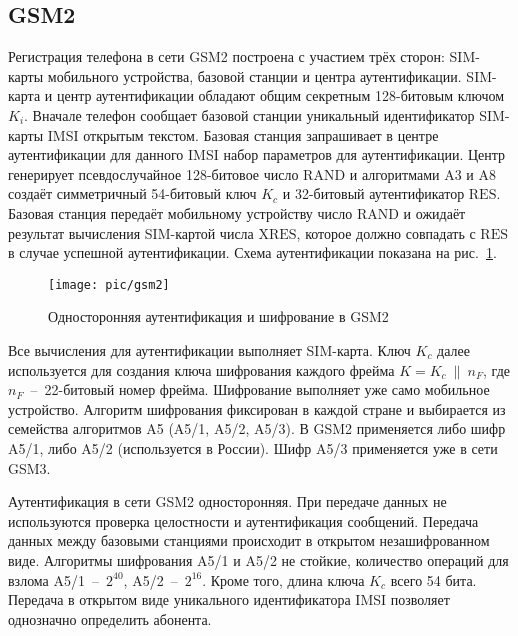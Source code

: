 \subsection{GSM2}

Регистрация телефона в сети GSM2 построена с участием трёх сторон: SIM-карты мобильного устройства, базовой станции и центра аутентификации. SIM-карта и центр аутентификации обладают общим секретным 128-битовым ключом $K_i$. Вначале телефон сообщает базовой станции уникальный идентификатор SIM-карты IMSI открытым текстом. Базовая станция запрашивает в центре аутентификации для данного IMSI набор параметров для аутентификации. Центр генерирует псевдослучайное 128-битовое число $\textrm{RAND}$ и алгоритмами A3 и A8 создаёт симметричный 54-битовый ключ $K_c$ и 32-битовый аутентификатор $\textrm{RES}$. Базовая станция передаёт мобильному устройству число $\textrm{RAND}$ и ожидаёт результат вычисления SIM-картой числа $\textrm{XRES}$, которое должно совпадать с $\textrm{RES}$ в случае успешной аутентификации. Схема аутентификации показана на рис.~\ref{fig:gsm2}.

\begin{figure}[!ht]
	\centering
	\texttt{[image: pic/gsm2]}
	\caption{Односторонняя аутентификация и шифрование в GSM2\label{fig:gsm2}}
\end{figure}

Все вычисления для аутентификации выполняет SIM-карта. Ключ $K_c$ далее используется для создания ключа шифрования каждого фрейма $K = K_c ~\|~ n_F$, где $n_F$~--~22-битовый номер фрейма. Шифрование выполняет уже само мобильное устройство. Алгоритм шифрования фиксирован в каждой стране и выбирается из семейства алгоритмов A5 (A5/1, A5/2, A5/3). В GSM2 применяется либо шифр A5/1, либо A5/2 (используется в России). Шифр A5/3 применяется уже в сети GSM3.

Аутентификация в сети GSM2 односторонняя. При передаче данных не используются проверка целостности и аутентификация сообщений. Передача данных между базовыми станциями происходит в открытом незашифрованном виде. Алгоритмы шифрования A5/1 и A5/2 не стойкие, количество операций для взлома A5/1~--~$2^{40}$, A5/2~--~$2^{16}$. Кроме того, длина ключа $K_c$ всего 54 бита. Передача в открытом виде уникального идентификатора IMSI позволяет однозначно определить абонента.
